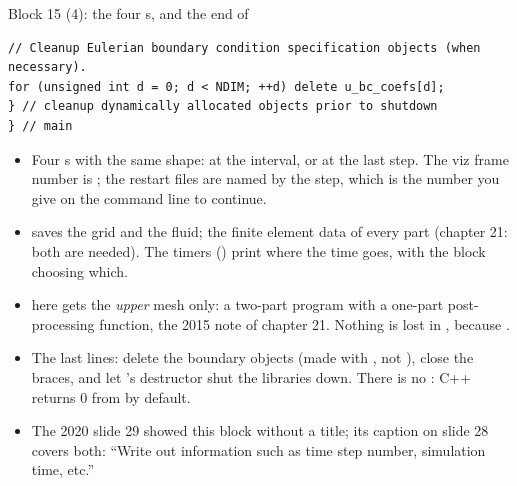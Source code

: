 \documentclass[aspectratio=169,11pt]{beamer}
\begin{document}
\begin{frame}[fragile]{Block 15 (4): the four s, and the end of }
\label{fr:outblock2}
\begin{lstlisting}[style=cpptiny]
// Cleanup Eulerian boundary condition specification objects (when necessary).
for (unsigned int d = 0; d < NDIM; ++d) delete u_bc_coefs[d];
} // cleanup dynamically allocated objects prior to shutdown
} // main
\end{lstlisting}
\footnotesize
\begin{itemize}
  \item Four s with the same shape: at the interval, or at the last step. The viz frame number is ; the restart files are named by the step, which is the number you give on the command line to continue.
  \item {} saves the grid and the fluid;  the finite element data of every part (chapter 21: both are needed). The timers () print where the time goes, with the  block choosing which.
  \item {} here gets the \emph{upper} mesh only: a two-part program with a one-part post-processing function, the 2015 note of chapter 21. Nothing is lost in , because .
  \item The last lines: delete the boundary objects (made with , not ), close the braces, and let 's destructor shut the libraries down. There is no : C++ returns $0$ from  by default.
  \item The 2020 slide 29 showed this block without a title; its caption on slide 28 covers both: ``Write out information such as time step number, simulation time, etc.''
\end{itemize}
\end{frame}
\end{document}
